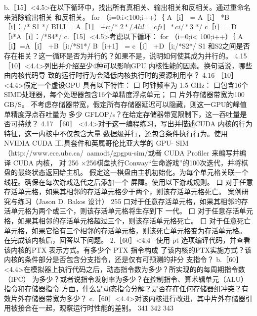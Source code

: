 b.［15］<4.5>在以下循环中，找出所有真相关、输出相关和反相关。通过重命名来消除输出相关
和反相关。
for （i=0:i<100;i++）｛
A［i］ = A［i］ *B［i］：/* S1 */
BI1J = A［1］ +c;/* $2*/
Alil = cfi］ *ci /* $3 */
c［i］= D［i*A［i］：/*S4*/
c.［15］<4.5>考虑以下循环：
for （i=0;i< 100;i++）｛
A［i】=A［i］ +B［i:/*S1*/
B［i+1］ = c［i］ +D［i;/*S2*/
S1 和S2之间是否存在相关？这一循环是否为并行的？如果不是，说明如何使其成为并行的。
4.15 ［10］<4.4>列出并介绍至少4种可以影响GPU 内核性能的因素。换句话说，哪些由内核代码导
致的运行时行为会降低内核执行时的资源利用率？
4.16 ［10］<4.4>假定一个虚设GPU 具有以下特性：
口 时钟频率为 1.5 GHz：
口包含16个 SIMD处理器，每个处理器包含16个单精度浮点单元；
口 片外存储器带宽为100 GB/S。
不考虑存储器带宽，假定所有存储器延迟可以隐藏，则这一GPU的峰值单精度浮点吞吐量为
多少 GFLOP/s？在给定存储器带宽限制下，这一吞吐量是否可持续？
4.17
［60］ <4.4>对于这一编程练习，写出并描述CUDA 内核的行为特征，这一内核中不仅包含大量
数据级并行，还包含条件执行行为。使用 NVIDIA CUDA 工.具套件和英属哥伦比亚大学的 GPU-
SIM （http://www.ece.ubc.ca/~aamodt/gpgpu-sim/或者 CUDA Profiler 来编写并编译 CUDA 内核，
对 256 ×256棋盘执行Conway“生命游戏”的100次迭代，并将棋盘的最终状态返回给主机。
假定这一棋盘由主机初始化。为每个单元格关联一个线程。确保在每次游戏迭代之后添加一个
屏障。使用以下游戏规则。
口 对于任意存活单元格，如果其相邻的存活单元格少于两个，则该存活单元格死亡。
案例研究与练习（Jason D. Bakos 设计）
255
口对于任意存活单元格，如果其相邻的存活单元格为两个或三个，则该存活单元格将生存到下
一代。
口 对于任意存活单元格，如果其相邻的存活单元格超过三个，则该存活单元格死亡。
口 对于任意死亡单元格，如果它恰有三个相邻的存活单元格，则该死亡单元格变为存活单元格。
在完成该内核后，回答以下问题。
2.［60］<4.4~-使用-pt 选项编译代码，并查看该内核的PTX 表示方式。有多少个 PTX 指令构成
了该内核的PTX实施方式？该内核的条件部分是否包含分支指令，还是仅有可预测的非分
支指令？
b.［60］<4.4>在模拟器上执行代码之后，动态指令数为多少？所实现的的每周期指令数（IPC）
为多少？或者说指令发射率为多少？在控制指令、算术辑单元（ALU）指令和存储器指令
方面，什么是动态指令分解？是否存在任何存储器组冲突？有效片外存储器带宽为多少？
c.［60］<4.4>对该内核进行改进，其中片外存储器引用被接合在一起，观察运行时性能的差别。
341
342
343